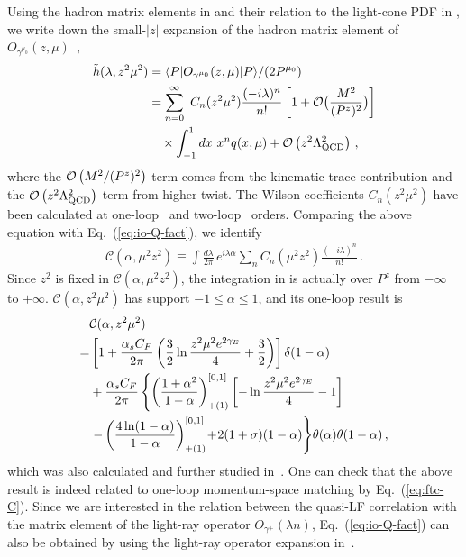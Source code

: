 Using the hadron matrix elements in  and their relation to the light-cone PDF
in ,
we write down the small-$|z|$ expansion of the hadron matrix element of $O_{\gamma^{\mu_0}}(z,\mu) $~\cite{Izubuchi:2018srq},
\begin{align}\label{eq:ope}
	\tilde{h}(\lambda,z^2\mu^2)&=\langle P| O_{\gamma^{\mu_0}}(z,\mu) |P\rangle/(2P^{\mu_0}) \nonumber\\
	&= \sum_{n=0}^\infty\ C_n(z^2\mu^2){(-i\lambda)^n\over n!}\left[1+{\cal O}\big({M^2\over (P^z)^2}\big)\right]\nonumber\\
	&\quad\times \int_{-1}^1 dx\ x^n q(x,\mu) + {\cal O}\left(z^2\Lambda_{\text{QCD}}^2\right)\,,
\end{align}
where the ${\cal O}\left(M^2/(P^z)^2\right)$ term comes from the kinematic trace contribution and
the ${\cal O}\left(z^2\Lambda_{\text{QCD}}^2\right)$ term from higher-twist.
The Wilson coefficients $C_n(z^2\mu^2)$ have been calculated at one-loop~\cite{Izubuchi:2018srq} and two-loop~\cite{Li:2020xml} orders.
Comparing the above equation with Eq.~(\ref{eq:io-Q-fact}),
we identify
\begin{align}  \label{eq:fac-C}
	\mathcal{C} (\alpha, {\mu}^2 z^2) \equiv \int\! \frac{d \lambda}{2 \pi} \,
	e^{i  \lambda \alpha}  \sum_n C_n ({\mu}^2 z^2)  \frac{(-i \lambda)^n}{n!}
	\,.
\end{align}
Since $z^2$ is fixed in $\mathcal{C} (\alpha, {\mu}^2 z^2)$, the integration in  is actually over $P^z$ from $-\infty$ to $+\infty$.
$\mathcal{C}(\alpha,z^2\mu^2)$ has support $-1 \le \alpha \le 1$,
and its one-loop result is
\begin{align} \label{eq:ps-c}
	&{\cal C}(\alpha,z^2\mu^2)\\
	=& \left[ 1+ {\alpha_sC_F\over 2\pi}\left({3\over2}\ln{z^2\mu^2e^{2\gamma_E}\over 4}+{3\over2}\right)\right]\delta(1-\alpha)\nonumber
	\\
	&+ {\alpha_sC_F\over 2\pi}\left\{\left({1+\alpha^2\over 1-\alpha}\right)^{[0,1]}_{+(1)}\left[-\ln{z^2\mu^2e^{2\gamma_E}\over 4}-1\right]\right.\nonumber\\
	&\left. - \left(4\ln(1-\alpha)\over 1-\alpha\right)^{[0,1]}_{+(1)}\!  +\!2(1+\sigma)(1-\alpha)\right\}\!\theta(\alpha)\theta(1-\alpha)
	\,,\nonumber
\end{align}
which was also calculated and further studied in~\cite{Ji:2017rah,Radyushkin:2017lvu,Radyushkin:2018cvn,Zhang:2018ggy,Li:2020xml}.
One can check that the above result is indeed related to one-loop momentum-space
matching by Eq.~(\ref{eq:ftc-C}).
Since we are interested in the relation between the
quasi-LF correlation with the matrix element of the light-ray operator
$O_{\gamma^+}(\lambda n)$, Eq.~(\ref{eq:io-Q-fact})
can also be obtained by using the light-ray operator
expansion in~\cite{Balitsky:1987bk,Braun:1994jq,Braun:2007wv}.

